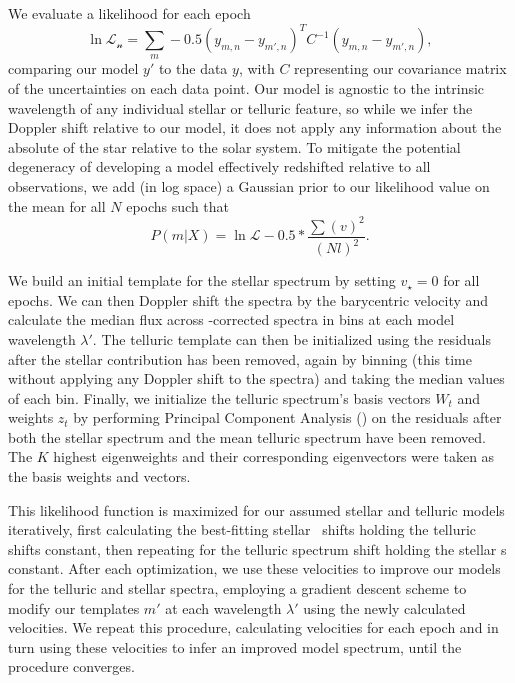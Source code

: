 \documentclass[modern]{aastex62}
\begin{document}
We evaluate a likelihood for each epoch
$$ \ln \mathcal{L_n} = \sum_{m} -0.5 (y_{m,n} - y_{m',n})^T C^{-1} (y_{m,n}-y_{m',n}),
$$
comparing our model $y'$ to the data $y$, with $C$ representing our covariance matrix of the uncertainties on each data point.
Our model is agnostic to the intrinsic wavelength of any individual stellar or telluric feature, so while we infer the  Doppler shift relative to our model, it does not apply any information about the absolute \RV of the star relative to the solar system. 
To mitigate the potential degeneracy of developing a model effectively redshifted relative to all observations, we add (in log space) a Gaussian prior to our likelihood value on the mean \RV for all $N$ epochs such that
$$ P(m|X) = \ln \mathcal{L}  -0.5 * \frac{\sum(v)^2}{(Nl)^2}.
$$

We build an initial template for the stellar spectrum by setting $v_{\star} = 0$ for all epochs. We can then Doppler shift the spectra by the barycentric velocity \BERV and calculate the median flux across \BERV-corrected spectra in bins at each model wavelength $\lambda'$. The telluric template can then be initialized using the residuals after the stellar contribution has been removed, again by binning (this time without applying any Doppler shift to the spectra) and taking the median values of each bin. Finally, we initialize the telluric spectrum's basis vectors $W_t$ and weights $z_t$ by performing Principal Component Analysis () on the residuals after both the stellar spectrum and the mean telluric spectrum have been removed. The $K$ highest eigenweights and their corresponding eigenvectors were taken as the basis weights and vectors. 

This likelihood function is maximized for our assumed stellar and telluric models iteratively, first calculating the best-fitting stellar \RV\ shifts holding the telluric shifts constant, then repeating for the telluric spectrum shift holding the stellar \RV s constant.
After each optimization, we use these velocities to improve our models for the telluric and stellar spectra, employing a gradient descent scheme to modify our templates $m'$ at each wavelength $\lambda'$ using the newly calculated velocities.
We repeat this procedure, calculating velocities for each epoch and in turn using these velocities to infer an improved model spectrum, until the procedure converges. 
\end{document}
